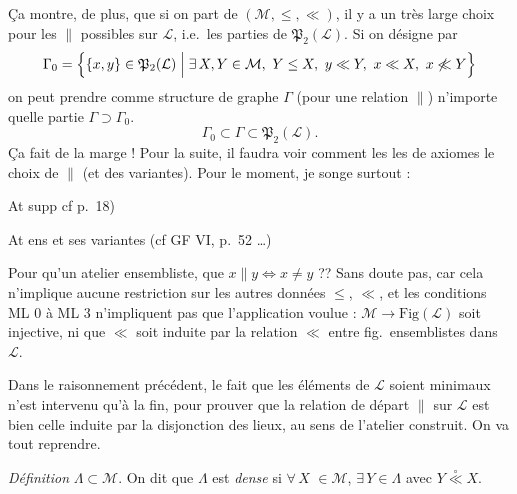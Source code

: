 \documentclass[11pt,a4paper]{article}
\begin{document}
Ça montre, de plus, que si on part de $(\mathcal{M}, \leq, \ll)$, il y a un très large choix pour les $\parallel$ possibles sur $\mathcal{L}$, i.e.\ les parties  de $\mathfrak{P}_2(\mathcal{L})$. Si on désigne par
\[
  \Gamma_0 = \Bigl\lbrace \lbrace x, y \rbrace \in \mathfrak{P}_2(\mathcal{L}) \Bigm| \exists\, X, Y \in \mathcal{M},\ Y \leq X,\ y \ll Y,\ x \ll X,\ x \not\ll Y \Bigr\rbrace
\]
on peut prendre comme structure de graphe $\Gamma$  (pour une relation $\parallel$) n'importe quelle partie $\Gamma \supset \Gamma_0$.
\[
  \Gamma_0 \subset \Gamma \subset \mathfrak{P}_2(\mathcal{L}) .
\]
Ça fait de la marge ! Pour la suite, il faudra voir comment les  \ill{} les  de  axiomes \ill{} \ill{} le choix de $\parallel$ (et des variantes). Pour le moment, je songe surtout :

At supp \quad cf p.~18)

At ens et ses variantes \quad (cf GF VI, p.~52 \ldots)

 Pour qu'un atelier   ensembliste,  que $x \parallel y \Leftrightarrow x \neq y$ ?? Sans doute pas, car cela n'implique aucune restriction sur les autres données $\leq$, $\ll$, et les conditions ML 0 à ML 3 n'impliquent pas que l'application voulue : $\mathcal{M} \longrightarrow \mathrm{Fig}(\mathcal{L})$ soit injective, ni que $\ll$ soit induite par la relation $\ll$ entre fig.\ ensemblistes dans $\mathcal{L}$.

Dans le raisonnement précédent, le fait que les éléments de $\mathcal{L}$ soient minimaux n'est intervenu qu'à la fin, pour prouver que la relation de départ $\parallel$ sur $\mathcal{L}$ est bien celle induite par la disjonction des lieux, au sens de l'atelier construit. On va tout reprendre.

\emph{Définition}  $\Lambda \subset \mathcal{M}$. On dit que $\Lambda$ est \emph{dense}  si $\forall\, X$ \struck{\ill{}} $\in \mathcal{M}$, $\exists\, Y \in \Lambda$ avec $Y \mathrel{\overset{\circ}{\ll}} X$.
\end{document}
